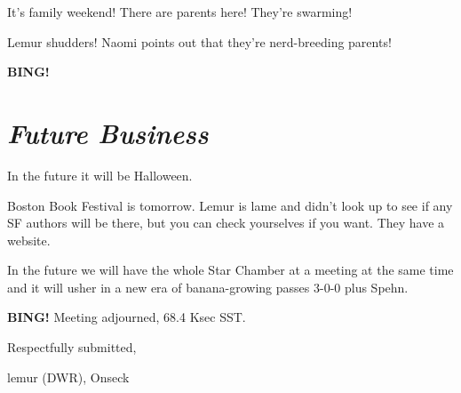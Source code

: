 \documentclass[10pt]{article}
\newcommand{\bing}{{\bf BING!} }
\newcommand{\goto}[1]{\bing \vskip 12pt \section*{{\em{#1}}}}
\newcommand{\ps}{ plus Spehn\xspace}
\newcommand{\onseck}{lemur (DWR), Onseck}
\begin{document}
It's family weekend!  There are parents here!  They're swarming!

Lemur shudders!  Naomi points out that they're nerd-breeding parents!

\goto{Future Business}

In the future it will be Halloween.

Boston Book Festival is tomorrow.  Lemur is lame and didn't look up to
see if any SF authors will be there, but you can check yourselves if you
want.  They have a website.

In the future we will have the whole Star Chamber at a meeting at the same
time and it will usher in a new era of banana-growing passes 3-0-0\ps.

\bing
\noindent
Meeting adjourned, 68.4 Ksec SST.

\vspace{18pt}

\centerline{Respectfully submitted,}
\centerline{\onseck}
\end{document}
